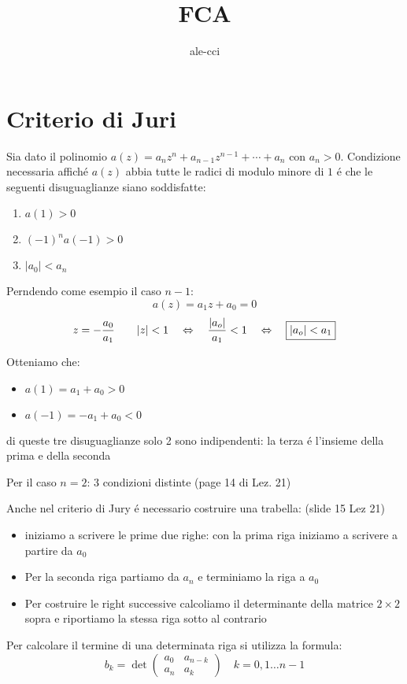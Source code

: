 \documentclass{article}
\title{FCA}
\author{ale-cci}
\begin{document}
\maketitle
\newpage
\section{Criterio di Juri}
Sia dato il polinomio $a(z) = a_n z^n + a_{n-1} z^{n-1} + \cdots + a_n$ con $a_n > 0$. Condizione necessaria affich\'e $a(z)$ abbia tutte le radici di modulo minore di $1$ \'e che le seguenti disuguaglianze siano soddisfatte:

\begin{enumerate}
    \item $a(1) > 0$
    \item $(-1)^n a(-1) > 0$
    \item $|a_0| < a_n$
\end{enumerate}

Perndendo come esempio il caso $n - 1$:
\[ a(z) = a_1z + a_0 = 0 \]
\[ z = -\frac{a_0}{a_1} \qquad |z| < 1 \quad \Leftrightarrow \quad \frac{|a_o|}{a_1} < 1 \quad \Leftrightarrow\quad  \framebox{$|a_o| < a_1$} \]

Otteniamo che:
\begin{itemize}
    \item $ a(1) = a_1 + a_0 > 0$
    \item $ a(-1) = -a_1 + a_0 < 0$
\end{itemize}

di queste tre disuguaglianze solo 2 sono indipendenti: la terza \'e l'insieme della prima e della seconda

Per il caso $n = 2$: 3 condizioni distinte (page 14 di Lez. 21)


\bigbreak
Anche nel criterio di Jury \'e necessario costruire una trabella: (slide 15 Lez 21)
\begin{itemize}
    \item iniziamo a scrivere le prime due righe: con la prima riga iniziamo a scrivere a partire da $a_0$
    \item Per la seconda riga partiamo da $a_n$ e terminiamo la riga a $a_0$
    \item Per costruire le right successive calcoliamo il determinante della matrice $2\times 2$ sopra e riportiamo la stessa riga sotto al contrario
\end{itemize}

Per calcolare il termine di una determinata riga si utilizza la formula:
\[
    b_k = \det\begin{pmatrix}
        a_0 & a_{n-k}\\
        a_n & a_k
    \end{pmatrix} \quad k = 0,1\ldots n-1
\]
\end{document}
